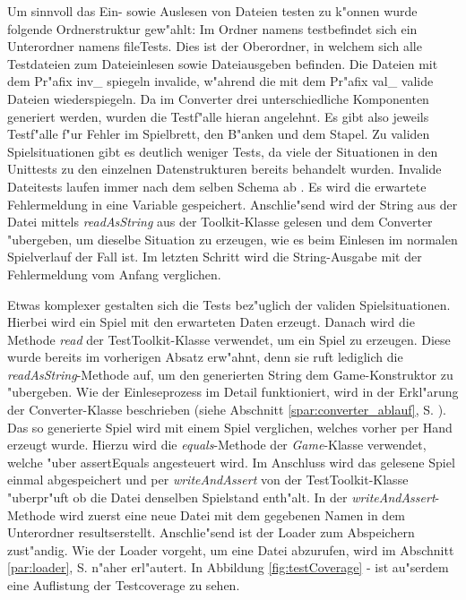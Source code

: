 Um sinnvoll das Ein- sowie Auslesen von Dateien testen zu k"onnen wurde folgende Ordnerstruktur gew"ahlt: Im Ordner namens \glqq test\grqq befindet sich ein Unterordner namens \glqq fileTests\grqq {}. Dies ist der Oberordner, in welchem sich alle Testdateien zum Dateieinlesen sowie Dateiausgeben befinden. Die Dateien mit dem Pr"afix \glqq inv\_\grqq {} spiegeln invalide, w"ahrend die mit dem Pr"afix \glqq val\_\grqq {} valide Dateien wiederspiegeln. Da im Converter drei unterschiedliche Komponenten generiert werden, wurden die Testf"alle hieran angelehnt. Es gibt also jeweils Testf"alle f"ur Fehler im Spielbrett, den B"anken und dem Stapel. Zu validen Spielsituationen gibt es deutlich weniger Tests, da viele der Situationen in den Unittests zu den einzelnen Datenstrukturen bereits behandelt wurden. Invalide Dateitests laufen immer nach dem selben Schema ab . Es wird die erwartete Fehlermeldung in eine Variable gespeichert. Anschlie"send wird der String aus der Datei mittels \emph{readAsString} aus der Toolkit-Klasse gelesen und dem Converter "ubergeben, um dieselbe Situation zu erzeugen, wie es beim Einlesen im normalen Spielverlauf der Fall ist. Im letzten Schritt wird die String-Ausgabe mit der Fehlermeldung vom Anfang verglichen. 

Etwas komplexer gestalten sich die Tests bez"uglich der validen Spielsituationen. Hierbei wird ein Spiel mit den erwarteten Daten erzeugt. Danach wird die Methode \emph{read} der TestToolkit-Klasse verwendet, um ein Spiel zu erzeugen. Diese wurde bereits im vorherigen Absatz erw"ahnt, denn sie ruft lediglich die \emph{readAsString}-Methode auf, um den generierten String dem Game-Konstruktor zu "ubergeben. Wie der Einleseprozess im Detail funktioniert, wird in der Erkl"arung der Converter-Klasse beschrieben (siehe Abschnitt \ref{spar:converter_ablauf}, S. \pageref{spar:converter_ablauf}). Das so generierte Spiel wird mit einem Spiel verglichen, welches vorher \glqq per Hand\grqq {} erzeugt wurde. Hierzu wird die \emph{equals}-Methode der \emph{Game}-Klasse verwendet, welche "uber assertEquals angesteuert wird. Im Anschluss wird das gelesene Spiel einmal abgespeichert und per \emph{writeAndAssert} von der TestToolkit-Klasse "uberpr"uft ob die Datei denselben Spielstand enth"alt. In der \emph{writeAndAssert}-Methode wird zuerst eine neue Datei mit dem gegebenen Namen in dem Unterordner \glqq results\grqq  erstellt. Anschlie"send ist der Loader zum Abspeichern zust"andig. Wie der Loader vorgeht, um eine Datei abzurufen, wird im Abschnitt \ref{par:loader}, S. \pageref{par:loader} n"aher erl"autert. 
In Abbildung \ref{fig:testCoverage} -  ist au"serdem eine Auflistung der Testcoverage zu sehen.

